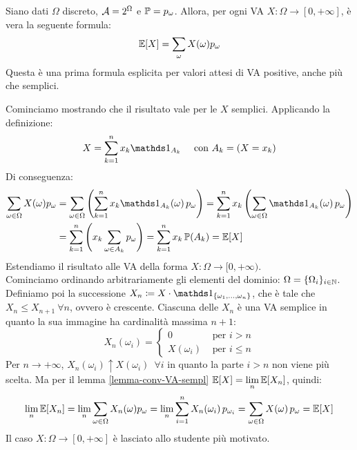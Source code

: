 \begin{ese}
  Siano dati $\Omega$ discreto, $\mathcal A = 2^\Omega$ e $\mathbb P = p_\omega$.
  Allora, per ogni VA $X: \Omega \to [0,+\infty]$, è vera la seguente formula:
  $$\mathbb E[X] = \sum\limits_\omega X(\omega) p_\omega$$
  Questa è una prima formula esplicita per valori attesi di VA positive, anche più che semplici.
  \begin{dimo}
  Cominciamo mostrando che il risultato vale per le $X$ semplici.
  Applicando la definizione:
  $$X = \sum\limits_{k=1}^n x_k \Ind_{A_k} \quad \text{ con } A_k = (X = x_k)$$
  Di conseguenza:
  \begin{align*}
    \sum\limits_{\omega \in \Omega} X(\omega) p_\omega
    &= \sum\limits_{\omega \in \Omega} \left( \sum\limits_{k=1}^n x_k \Ind_{A_k}(\omega) \, p_\omega \right)
    = \sum\limits_{k=1}^n x_k \left( \sum\limits_{\omega \in \Omega} \Ind_{A_k}(\omega) \, p_\omega \right)\\
    &= \sum\limits_{k=1}^n \left(x_k \sum\limits_{\omega \in A_k} p_\omega \right)
    = \sum\limits_{k=1}^n x_k \, \PP(A_k)
    = \EE[X]
  \end{align*}
  Estendiamo il risultato alle VA della forma $X: \Omega \to [0, +\infty)$. \\
  Cominciamo ordinando arbitrariamente gli elementi del dominio:
  $\Omega = \{\Omega_i\}_{i \in \mathbb N}$. \\
  Definiamo poi la successione $X_n \coloneqq X \cdot \Ind_{\{ \omega_1, \dots, \omega_n \}}$, che è tale che $X_n \le X_{n+1} \ \forall n$, ovvero è crescente.
  Ciascuna delle $X_n$ è una VA semplice in quanto la sua immagine ha cardinalità massima $n+1$:
  $$
    X_n(\omega_i) =
      \begin{cases}
        0 & \text{ per } i > n\\
        X(\omega_i) & \text{ per } i \le n
      \end{cases}
  $$
	Per $n \to +\infty$, $X_n(\omega_i) \uparrow X(\omega_i) \enspace \forall i$ in quanto la parte $i > n$ non viene più scelta.
	Ma per il lemma \ref{lemma-conv-VA-sempl} $\mathbb E[X] = \lim\limits_n \mathbb E[X_n]$, quindi:
  $$
    \lim\limits_n \mathbb E[X_n] = \lim\limits_n \sum\limits_{\omega \in \Omega} X_n(\omega) p_\omega
    = \lim\limits_n \sum\limits_{i=1}^n X_n(\omega_i) \, p_{\omega_i}
    = \sum\limits_{\omega \in \Omega} X(\omega) \, p_{\omega}
    = \mathbb E[X]
  $$
  Il caso $X: \Omega \to [0, +\infty]$ è lasciato allo studente più motivato.
  \end{dimo}
\end{ese}

